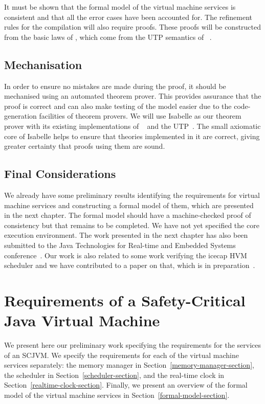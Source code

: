 \documentclass[a4paper,10pt]{report}
\begin{document}
It must be shown that the formal model of the virtual machine services is
consistent and that all the error cases have been accounted for.  The refinement
rules for the compilation will also require proofs.  These proofs will be
constructed from the basic laws of \Circus{}, which come from the UTP semantics
of \Circus{}~\cite{oliveira2009}.

\section{Mechanisation}

In order to ensure no mistakes are made during the proof, it should be
mechanised using an automated theorem prover. This provides assurance that the
proof is correct and can also make testing of the model easier due to the
code-generation facilities of theorem provers.  We will use Isabelle as our theorem
prover with its existing implementations of \Circus{}~\cite{feliachi2012} and 
the UTP~\cite{foster2015}.  The small axiomatic core of Isabelle helps to ensure
that theories implemented in it are correct, giving greater certainty that
proofs using them are sound.

\section{Final Considerations}

We already have some preliminary results identifying the requirements for
virtual machine services and constructing a formal model of them, which are
presented in the next chapter.  The formal model should have a machine-checked
proof of consistency but that remains to be completed.  We have not yet
specified the core execution environment.  The work presented in the next
chapter has also been submitted to the Java Technologies for Real-time and
Embedded Systems conference~\cite{baxter2015submitted}.  Our work is also
related to some work verifying the icecap HVM scheduler and we have contributed
to a paper on that, which is in preparation~\cite{freitas2015inpreparation}.

\chapter{Requirements of a Safety-Critical Java Virtual Machine}
\label{requirements-chapter}

We present here our preliminary work specifying the requirements for the
services of an SCJVM.  We specify the requirements for each of the virtual
machine services separately: the memory manager in
Section~\ref{memory-manager-section}, the scheduler in
Section~\ref{scheduler-section}, and the real-time clock in
Section~\ref{realtime-clock-section}.  Finally, we present an overview of the
formal model of the virtual machine services in
Section~\ref{formal-model-section}.
\end{document}
